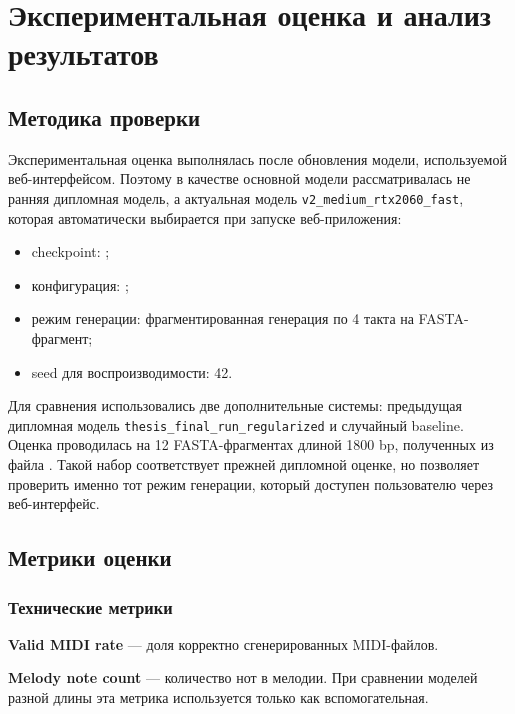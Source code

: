 \chapter{Экспериментальная оценка и анализ результатов}

\section{Методика проверки}

Экспериментальная оценка выполнялась после обновления модели, используемой веб-интерфейсом. Поэтому в качестве основной модели рассматривалась не ранняя дипломная модель, а актуальная модель \texttt{v2\_medium\_rtx2060\_fast}, которая автоматически выбирается при запуске веб-приложения:

\begin{itemize}
\item checkpoint: ;
\item конфигурация: ;
\item режим генерации: фрагментированная генерация по 4 такта на FASTA-фрагмент;
\item seed для воспроизводимости: 42.
\end{itemize}

Для сравнения использовались две дополнительные системы: предыдущая дипломная модель \texttt{thesis\_final\_run\_regularized} и случайный baseline. Оценка проводилась на 12 FASTA-фрагментах длиной 1800 bp, полученных из файла . Такой набор соответствует прежней дипломной оценке, но позволяет проверить именно тот режим генерации, который доступен пользователю через веб-интерфейс.

\section{Метрики оценки}

\subsection{Технические метрики}

\textbf{Valid MIDI rate} — доля корректно сгенерированных MIDI-файлов.

\textbf{Melody note count} — количество нот в мелодии. При сравнении моделей разной длины эта метрика используется только как вспомогательная.

